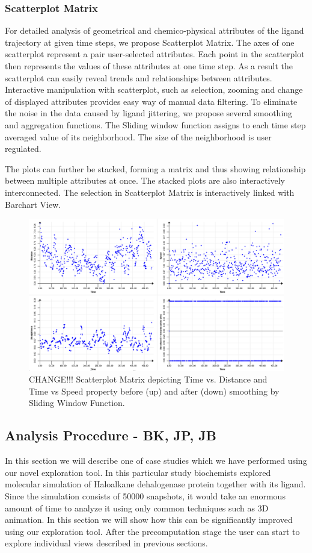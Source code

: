 \documentclass[twocolumn]{bmcart}%
\begin{document}
\subsubsection*{Scatterplot Matrix}
For detailed analysis of geometrical and chemico-physical attributes of the ligand trajectory at given time steps, we propose Scatterplot Matrix.
The axes of one scatterplot represent a pair user-selected attributes.
Each point in the scatterplot then represents the values of these attributes at one time step.
As a result the scatterplot can easily reveal trends and relationships between attributes.
Interactive manipulation with scatterplot, such as selection, zooming and change of displayed attributes provides easy way of manual data filtering. 
To eliminate the noise in the data caused by ligand jittering, we propose several smoothing and aggregation functions.
The Sliding window function assigns to each time step averaged value of its neighborhood.
The size of the neighborhood is user regulated. 

The plots can further be stacked, forming a matrix and thus showing relationship between multiple attributes at once.
The stacked plots are also interactively interconnected.
The selection in Scatterplot Matrix is interactively linked with Barchart View.

\begin{figure}[htb]
	\centering
  \includegraphics[width=0.95\linewidth]{img/scatterplot.png}
  \caption{\label{fig:scatterplot} CHANGE!!! Scatterplot Matrix depicting Time vs. Distance and Time vs Speed property before (up) and after (down) smoothing by Sliding Window Function.}
\end{figure}


\subsection*{Analysis Procedure - BK, JP, JB}
In this section we will describe one of case studies which we have performed using our novel exploration tool.
In this particular study biochemists explored molecular simulation of Haloalkane dehalogenase protein together with its ligand. 
Since the simulation consists of 50000 snapshots, it would take an enormous amount of time to analyze it using only common techniques such as 3D animation.
In this section we will show how this can be significantly improved using our exploration tool.
After the precomputation stage the user can start to explore individual views described in previous sections.
\end{document}
